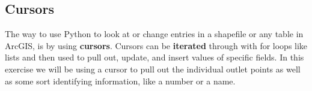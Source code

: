 \documentclass{article}
\begin{document}
\subsection{Cursors}
The way to use Python to look at or change entries in a shapefile or any table in ArcGIS, is by using \textbf{cursors}.  Cursors can be \textbf{iterated} through with for loops like lists and then used to pull out, update, and insert values of specific fields.  In this exercise we will be using a cursor to pull out the individual outlet points as well as some sort identifying information, like a number or a name.  
\end{document}
